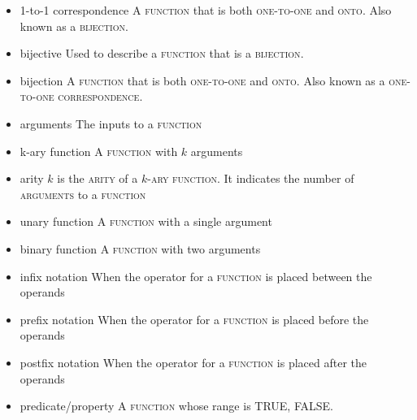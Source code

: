 \documentclass{article}
\newcommand{\term}[1]{\textsc{#1}}
\begin{document}
\bigskip \indent
\begin{itemize}
\item 1-to-1 correspondence
   \subitem A \term{function} that is both \term{one-to-one} and \term{onto}. Also known as a \term{bijection}.
\item bijective
  \subitem Used to describe a \term{function} that is a \term{bijection}.
\item bijection
   \subitem A \term{function} that is both \term{one-to-one} and \term{onto}. Also known as a \term{one-to-one correspondence}.
\item arguments
   \subitem The inputs to a \term{function}
\item k-ary function
   \subitem A \term{function} with $k$ arguments
\item arity
   \subitem $k$ is the \term{arity} of a \term{$k$-ary function}. It indicates the number of \term{arguments} to a \term{function}
\item unary function
   \subitem A \term{function} with a single argument
\item binary function
   \subitem A \term{function} with two arguments
\item infix notation
   \subitem When the operator for a \term{function} is placed between the operands
\item prefix notation
   \subitem When the operator for a \term{function} is placed before the operands
\item postfix notation
   \subitem When the operator for a \term{function} is placed after the operands
\item predicate/property
   \subitem A \term{function} whose range is {TRUE, FALSE}.
\end{itemize}
\end{document}
